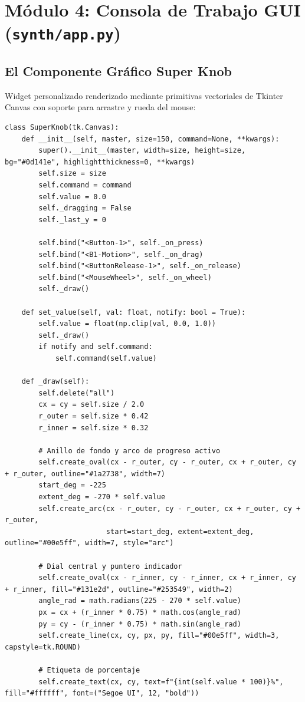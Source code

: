 \documentclass[11pt,a4paper]{article}
\begin{document}
\section{Módulo 4: Consola de Trabajo GUI (\texttt{synth/app.py})}

\subsection{El Componente Gráfico Super Knob}
Widget personalizado renderizado mediante primitivas vectoriales de Tkinter Canvas con soporte para arrastre y rueda del mouse:

\begin{lstlisting}
class SuperKnob(tk.Canvas):
    def __init__(self, master, size=150, command=None, **kwargs):
        super().__init__(master, width=size, height=size, bg="#0d141e", highlightthickness=0, **kwargs)
        self.size = size
        self.command = command
        self.value = 0.0
        self._dragging = False
        self._last_y = 0

        self.bind("<Button-1>", self._on_press)
        self.bind("<B1-Motion>", self._on_drag)
        self.bind("<ButtonRelease-1>", self._on_release)
        self.bind("<MouseWheel>", self._on_wheel)
        self._draw()

    def set_value(self, val: float, notify: bool = True):
        self.value = float(np.clip(val, 0.0, 1.0))
        self._draw()
        if notify and self.command:
            self.command(self.value)

    def _draw(self):
        self.delete("all")
        cx = cy = self.size / 2.0
        r_outer = self.size * 0.42
        r_inner = self.size * 0.32

        # Anillo de fondo y arco de progreso activo
        self.create_oval(cx - r_outer, cy - r_outer, cx + r_outer, cy + r_outer, outline="#1a2738", width=7)
        start_deg = -225
        extent_deg = -270 * self.value
        self.create_arc(cx - r_outer, cy - r_outer, cx + r_outer, cy + r_outer,
                        start=start_deg, extent=extent_deg, outline="#00e5ff", width=7, style="arc")

        # Dial central y puntero indicador
        self.create_oval(cx - r_inner, cy - r_inner, cx + r_inner, cy + r_inner, fill="#131e2d", outline="#253549", width=2)
        angle_rad = math.radians(225 - 270 * self.value)
        px = cx + (r_inner * 0.75) * math.cos(angle_rad)
        py = cy - (r_inner * 0.75) * math.sin(angle_rad)
        self.create_line(cx, cy, px, py, fill="#00e5ff", width=3, capstyle=tk.ROUND)

        # Etiqueta de porcentaje
        self.create_text(cx, cy, text=f"{int(self.value * 100)}%", fill="#ffffff", font=("Segoe UI", 12, "bold"))
\end{lstlisting}
\end{document}
